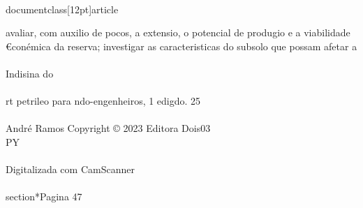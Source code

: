 \\documentclass[12pt]{article}
\begin{document}
avaliar, com auxilio de pocos, a extensio, o potencial de produgio e a viabilidade\\
€conémica da reserva; investigar as caracteristicas do subsolo que possam afetar a\\
\\
Indisina do\\
\\
rt petrileo para ndo-engenheiros, 1 edigdo. 25\\
\\
André Ramos Copyright © 2023 Editora Dois03\\
PY\\
\\
Digitalizada com CamScanner\\

\\section*{Pagina 47}
\end{document}
